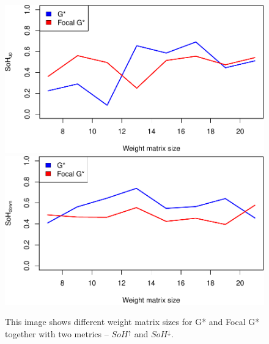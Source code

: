 \documentclass{itatnew}
\begin{document}
\begin{figure}[htp]
  \includegraphics[width=.45\linewidth]{images/gen-blur-sohup-1}
  \hspace{1em}
  \includegraphics[width=.45\linewidth]{images/gen-blur-sohdown-1}
  
  \caption{
    This image shows different weight matrix sizes for G* and Focal G* together 
    with two metrics -- $SoH^\uparrow$ and $SoH^\downarrow$.
  }
  \label{fig:Blur}
\end{figure}




\end{document}
